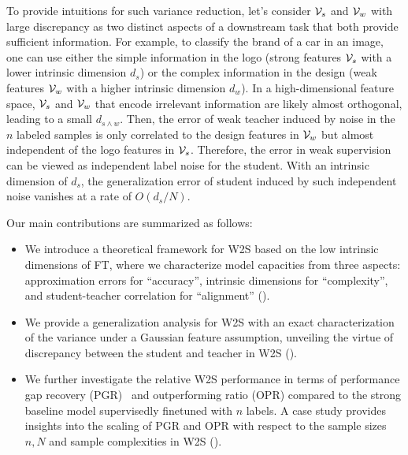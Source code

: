 To provide intuitions for such variance reduction, let's consider $\mathcal{V}_s$ and $\mathcal{V}_w$ with large discrepancy as two distinct aspects of a downstream task that both provide sufficient information. For example, to classify the brand of a car in an image, one can use either the simple information in the logo (strong features $\mathcal{V}_s$ with a lower intrinsic dimension $d_s$) or the complex information in the design (weak features $\mathcal{V}_w$ with a higher intrinsic dimension $d_w$). In a high-dimensional feature space, $\mathcal{V}_s$ and $\mathcal{V}_w$ that encode irrelevant information are likely almost orthogonal, leading to a small $d_{s \wedge w}$. Then, the error of weak teacher induced by noise in the $n$ labeled samples is only correlated to the design features in $\mathcal{V}_w$ but almost independent of the logo features in $\mathcal{V}_s$. {Therefore, the error in weak supervision can be viewed as independent label noise for the student. With an intrinsic dimension of $d_s$, the generalization error of student induced by such independent noise vanishes at a rate of $O(d_s/N)$.}    

Our main contributions are summarized as follows:
\begin{itemize}
    \item We introduce a theoretical framework for W2S based on the low intrinsic dimensions of FT, where we characterize model capacities from three aspects: approximation errors for ``accuracy'', intrinsic dimensions for ``complexity'', and student-teacher correlation for ``alignment'' ().
    
    \item We provide a generalization analysis for W2S with an exact characterization of the variance under a Gaussian feature assumption, unveiling the virtue of discrepancy between the student and teacher in W2S ().
    
    \item We further investigate the relative W2S performance in terms of performance gap recovery (PGR)~\citep{burns2023weak} and outperforming ratio (OPR) compared to the strong baseline model supervisedly finetuned with $n$ labels. A case study provides insights into the scaling of PGR and OPR with respect to the sample sizes $n, N$ and sample complexities in W2S ().
\end{itemize}




